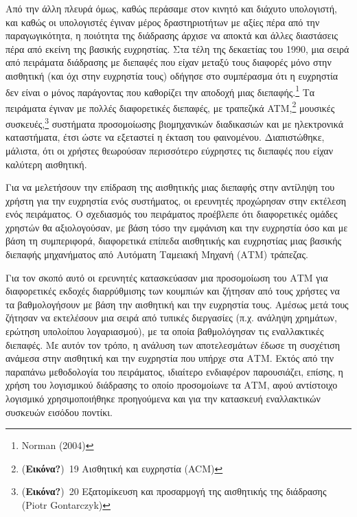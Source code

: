\documentclass[
]{article}
\begin{document}
Από την άλλη πλευρά όμως, καθώς περάσαμε στον κινητό και διάχυτο
υπολογιστή, και καθώς οι υπολογιστές έγιναν μέρος δραστηριοτήτων με
αξίες πέρα από την παραγωγικότητα, η ποιότητα της διάδρασης άρχισε να
αποκτά και άλλες διαστάσεις πέρα από εκείνη της βασικής ευχρηστίας. Στα
τέλη της δεκαετίας του 1990, μια σειρά από πειράματα διάδρασης με
διεπαφές που είχαν μεταξύ τους διαφορές μόνο στην αισθητική (και όχι
στην ευχρηστία τους) οδήγησε στο συμπέρασμα ότι η ευχρηστία δεν είναι ο
μόνος παράγοντας που καθορίζει την αποδοχή μιας διεπαφής.\footnote{Norman
  (2004)} Τα πειράματα έγιναν με πολλές διαφορετικές διεπαφές, με
τραπεζικά ATM,\footnote{(\textbf{Εικόνα?})~19 Αισθητική και ευχρηστία
  (ACM)} μουσικές συσκευές,\footnote{(\textbf{Εικόνα?})~20 Εξατομίκευση
  και προσαρμογή της αισθητικής της διάδρασης (Piotr Gontarczyk)}
συστήματα προσομοίωσης βιομηχανικών διαδικασιών και με ηλεκτρονικά
καταστήματα, έτσι ώστε να εξεταστεί η έκταση του φαινομένου.
Διαπιστώθηκε, μάλιστα, ότι οι χρήστες θεωρούσαν περισσότερο εύχρηστες
τις διεπαφές που είχαν καλύτερη αισθητική.

Για να μελετήσουν την επίδραση της αισθητικής μιας διεπαφής στην
αντίληψη του χρήστη για την ευχρηστία ενός συστήματος, οι ερευνητές
προχώρησαν στην εκτέλεση ενός πειράματος. Ο σχεδιασμός του πειράματος
προέβλεπε ότι διαφορετικές ομάδες χρηστών θα αξιολογούσαν, με βάση τόσο
την εμφάνιση και την ευχρηστία όσο και με βάση τη συμπεριφορά,
διαφορετικά επίπεδα αισθητικής και ευχρηστίας μιας βασικής διεπαφής
μηχανήματος από Αυτόματη Ταμειακή Μηχανή (ΑΤΜ) τράπεζας.

Για τον σκοπό αυτό οι ερευνητές κατασκεύασαν μια προσομοίωση του ΑΤΜ για
διαφορετικές εκδοχές διαρρύθμισης των κουμπιών και ζήτησαν από τους
χρήστες να τα βαθμολογήσουν με βάση την αισθητική και την ευχρηστία
τους. Αμέσως μετά τους ζήτησαν να εκτελέσουν μια σειρά από τυπικές
διεργασίες (π.χ. ανάληψη χρημάτων, ερώτηση υπολοίπου λογαριασμού), με τα
οποία βαθμολόγησαν τις εναλλακτικές διεπαφές. Με αυτόν τον τρόπο, η
ανάλυση των αποτελεσμάτων έδωσε τη συσχέτιση ανάμεσα στην αισθητική και
την ευχρηστία που υπήρχε στα ΑΤΜ. Εκτός από την παραπάνω μεθοδολογία του
πειράματος, ιδιαίτερο ενδιαφέρον παρουσιάζει, επίσης, η χρήση του
λογισμικού διάδρασης το οποίο προσομοίωνε τα ΑΤΜ, αφού αντίστοιχο
λογισμικό χρησιμοποιήθηκε προηγούμενα και για την κατασκευή εναλλακτικών
συσκευών εισόδου ποντίκι.
\end{document}
